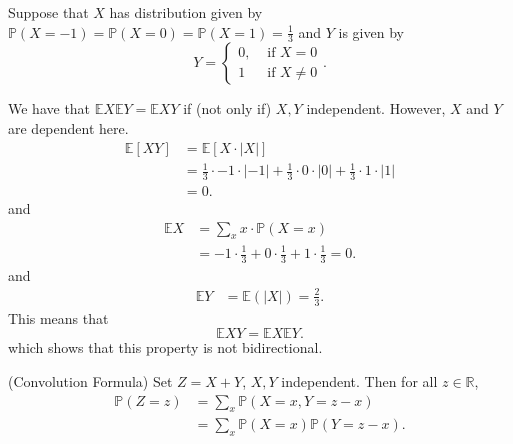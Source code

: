 \begin{eg}
	Suppose that \( X \) has distribution given by \( \mathbb{P}(X=-1) = \mathbb{P}(X=0) = \mathbb{P}(X=1) = \frac{1}{3} \) and \( Y \) is given by \[
		Y = \begin{cases}
			0, &\text{ if }X=0\\
			1 &\text{ if }X\neq 0
		\end{cases}
	.\] 
\end{eg}
\begin{explanation}
	We have that \( \mathbb{E}X \mathbb{E}Y = \mathbb{E}XY \) if (not only if) \( X,Y \) independent. However, \( X \) and \( Y \) are dependent here.
	\begin{align*}
		\mathbb{E}[XY] &= \mathbb{E}[X \cdot |X|] \\
		&=\frac{1}{3} \cdot -1\cdot |-1| + \frac{1}{3}\cdot 0\cdot |0|+\frac{1}{3} \cdot 1\cdot |1| \\
		&= 0 
	.\end{align*}
	and 
	\begin{align*}
		\mathbb{E}X &= \sum_{x}x\cdot \mathbb{P}(X=x) \\
		&= -1\cdot \frac{1}{3}+0\cdot \frac{1}{3}+1\cdot \frac{1}{3} = 0 
	.\end{align*}
	and 
	\begin{align*}
		\mathbb{E}Y &= \mathbb{E}(|X|) = \frac{2}{3} 
	.\end{align*}
	This means that \[
		\mathbb{E}XY = \mathbb{E}X\mathbb{E}Y 
	.\] which shows that this property is not bidirectional.
\end{explanation}

\begin{theorem}
	(Convolution Formula) Set \( Z=X+Y \), \( X,Y \) independent. Then for all \( z \in \mathbb{R} \),
	\begin{align*}
		\mathbb{P}(Z=z) &= \sum_{x} \mathbb{P}(X=x,Y=z-x) \\ &= \sum_{x}\mathbb{P}(X=x)\mathbb{P}(Y=z-x) 
	.\end{align*}
\end{theorem}

